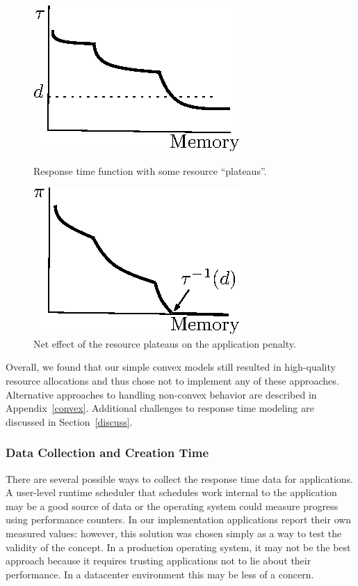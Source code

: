 \begin{figure}[hb]
\parbox{1.6in}{
\includegraphics*{Plateau1.eps}
\caption{\label{f:plat}Response time function with some resource ``plateaus''.}
}
\hspace{\fill}
\parbox{1.6in}{
\includegraphics*{Plateau2.eps}
\caption{\label{f:plateffect}Net effect of the resource plateaus on the application penalty.}
}
\end{figure}

Overall, we found that our simple convex models still resulted in high-quality resource allocations and thus chose not to implement any of these approaches.  Alternative approaches to handling non-convex behavior are described in Appendix~\ref{convex}. Additional challenges to response time modeling are discussed in Section~\ref{discuss}.

%
%
%


\subsubsection*{Data Collection and Creation Time}
There are several possible ways to collect the response time data for applications. A user-level runtime scheduler that schedules work internal to the application may be a good source of data or the operating system could measure progress using performance counters.  In our implementation applications report their own measured values: however, this solution was chosen simply as a way to test the validity of the concept.  In a production operating system, it may not be the best approach because it requires trusting applications not to lie about their performance.  In a datacenter environment this may be less of a concern.

